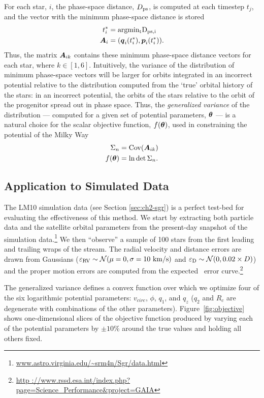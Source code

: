For each star, $i$, the phase-space distance, $D_{\rm ps}$, is computed at each
timestep $t_{j}$, and the vector with the minimum phase-space distance is stored
\begin{align}
  t^*_{i} &= \rm argmin_{t} D_{{\rm ps},i}\\
  \boldsymbol{A}_{i} &= (\boldsymbol{q}_{i}(t^*_{i}),\boldsymbol{p}_{i}(t^*_{i})).
\end{align}
Thus, the matrix $\boldsymbol{A}_{ik}$ contains these minimum phase-space distance
vectors for each star, where $k\in[1,6]$. Intuitively, the variance of the
distribution of minimum phase-space vectors will be larger for orbits integrated
in an incorrect potential relative to the distribution computed from the `true'
orbital history of the stars: in an incorrect potential, the orbits of the stars
relative to the orbit of the progenitor spread out in phase space. Thus, the
\emph{generalized variance} of the distribution --- computed for a given set of
potential parameters, $\boldsymbol{\theta}$ --- is a natural choice for the scalar
objective function, $f(\boldsymbol{\theta})$, used in constraining the potential of the
Milky Way
\begin{align}
  \Sigma_n &= \mathrm{Cov}( \boldsymbol{A}_{ik}) \\
  f(\boldsymbol{\theta}) &= \ln \det \Sigma_n.
\end{align}

\subsection{Application to Simulated Data} \label{sec:ch2-results}
The LM10 simulation data (see Section \ref{sec:ch2-sgr}) is a perfect test-bed for
evaluating the effectiveness of this method. We start by extracting both
particle data and the satellite orbital parameters from the present-day snapshot
of the simulation
data.\footnote{\url{www.astro.virginia.edu/~srm4n/Sgr/data.html}} We then
``observe'' a sample of 100 stars from the first leading and trailing wraps of
the stream. The radial velocity and distance errors are drawn from Gaussians
($\varepsilon_{\rm RV} \sim \mathcal{N}(\mu=0,\sigma=10~{\rm km/s})$ and
$\varepsilon_{\rm D} \sim \mathcal{N}(0,0.02\times D)$) and the proper motion
errors are computed from the expected \gaia\ error curve.\footnote{\url{http
://www.rssd.esa.int/index.php?page=Science_Performance&project=GAIA}}

The generalized variance defines a convex function over which we optimize four
of the six logarithmic potential parameters: $v_{circ}$, $\phi$, $q_1$, and
$q_z$ ($q_2$ and $R_c$ are degenerate with combinations of the other
parameters). Figure~\ref{fig:objective} shows one-dimensional slices of the
objective function produced by varying each of the potential parameters by
$\pm10\%$ around the true values and holding all others fixed.

